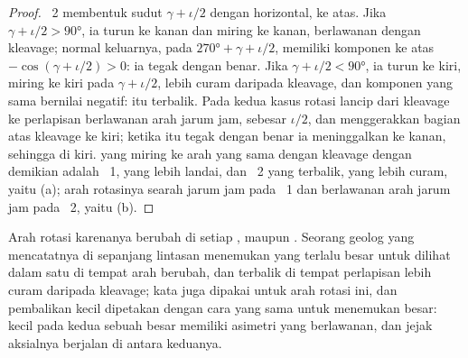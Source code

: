 \begin{proof}
~2 membentuk sudut $\gamma + \iota/2$ dengan horizontal, ke atas. Jika $\gamma + \iota/2 > \ang{90}$, ia turun ke kanan dan miring ke kanan, berlawanan dengan kleavage; normal keluarnya, pada $\ang{270} + \gamma +
\iota/2$, memiliki komponen ke atas $-\cos(\gamma + \iota/2) > 0$: ia tegak dengan benar. Jika $\gamma + \iota/2 < \ang{90}$, ia turun ke kiri, miring ke kiri pada $\gamma + \iota/2$, lebih curam daripada kleavage, dan komponen yang sama bernilai negatif:  itu terbalik. Pada kedua kasus rotasi lancip dari kleavage ke perlapisan berlawanan arah jarum jam, sebesar $\iota/2$, dan menggerakkan bagian atas kleavage ke kiri; ketika  itu tegak dengan benar ia meninggalkan  ke kanan, sehingga  di kiri.  yang miring ke arah yang sama dengan kleavage dengan demikian adalah ~1, yang lebih landai, dan ~2 yang terbalik, yang lebih curam, yaitu (a); arah rotasinya searah jarum jam pada ~1 dan berlawanan arah jarum jam pada ~2, yaitu (b).
\end{proof}

Arah rotasi karenanya berubah di setiap ,  maupun . Seorang geolog yang mencatatnya di sepanjang lintasan menemukan   yang terlalu besar untuk dilihat dalam satu  di tempat arah berubah, dan  terbalik di tempat perlapisan lebih curam daripada kleavage; kata  juga dipakai untuk arah rotasi ini, dan pembalikan   kecil dipetakan dengan cara yang sama untuk menemukan   besar:  kecil pada kedua  sebuah  besar memiliki asimetri yang berlawanan, dan jejak aksialnya berjalan di antara keduanya.

